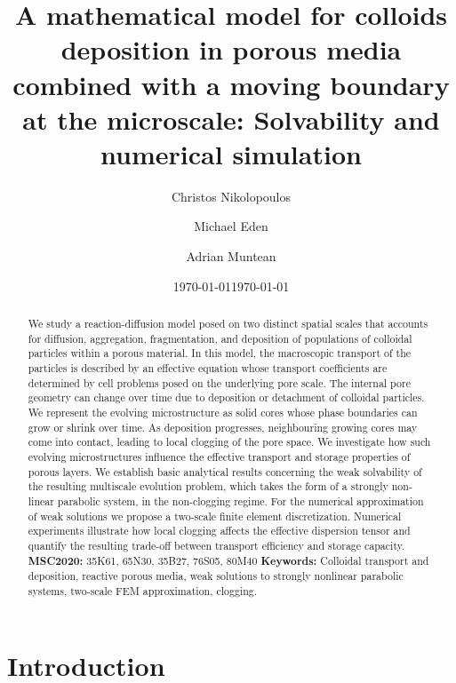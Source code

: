 \documentclass[reqno, 11pt]{amsart}
\date{\today}
\title[Colloids deposition in porous media]
{A mathematical model  for colloids deposition in porous media combined with a moving boundary at the  microscale: {S}olvability and numerical simulation}
\author{Christos Nikolopoulos}
\author{Michael Eden}
\author{Adrian Muntean}
\date{\today}
\numberwithin{equation}{section}
\newcommand{\clr}{\color{red}}
\begin{document}
\maketitle



\begin{abstract}
{\clr} We study a reaction-diffusion model posed on two distinct spatial scales that accounts for diffusion, aggregation, fragmentation, and deposition of populations of colloidal particles within a porous material.
In this model, the macroscopic transport of the particles is described by an effective equation whose transport coefficients are determined by cell problems posed on the underlying pore scale.
 The internal pore geometry can change over time due to deposition or detachment of colloidal particles.
We represent the evolving microstructure as solid cores whose phase boundaries can grow or shrink over time.
As deposition progresses, neighbouring growing cores may come into contact, leading to local clogging of the pore space.
We investigate how such evolving microstructures influence the effective transport and storage properties of porous layers.
We establish basic analytical results concerning the weak solvability of the resulting multiscale evolution problem, which takes the form of a strongly non-linear parabolic system, in the non-clogging regime. 
For the numerical approximation of weak solutions we propose a two-scale finite element discretization. Numerical experiments illustrate how local clogging affects the effective dispersion tensor and quantify the resulting trade-off between transport efficiency and storage capacity. 
\vskip0.5cm
 {\bf MSC2020:} 35K61, 65N30, 35B27, 76S05, 80M40
 \vskip0.5cm
{\bf Keywords:} Colloidal transport and deposition, reactive porous media, weak solutions to strongly nonlinear parabolic systems, two-scale FEM approximation, clogging.
\end{abstract}



\maketitle
\vspace{0.5in}


\section{Introduction}
\end{document}
